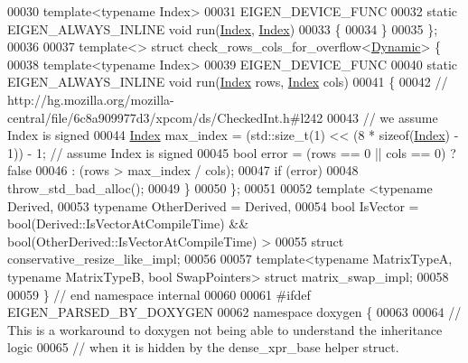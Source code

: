 \begin{DoxyCode}
00030   \textcolor{keyword}{template}<\textcolor{keyword}{typename} Index>
00031   EIGEN\_DEVICE\_FUNC
00032   \textcolor{keyword}{static} EIGEN\_ALWAYS\_INLINE \textcolor{keywordtype}{void} run(\hyperlink{namespace_eigen_a62e77e0933482dafde8fe197d9a2cfde}{Index}, \hyperlink{namespace_eigen_a62e77e0933482dafde8fe197d9a2cfde}{Index})
00033   \{
00034   \}
00035 \};
00036 
00037 \textcolor{keyword}{template}<> \textcolor{keyword}{struct }check\_rows\_cols\_for\_overflow<\hyperlink{namespace_eigen_ad81fa7195215a0ce30017dfac309f0b2}{Dynamic}> \{
00038   \textcolor{keyword}{template}<\textcolor{keyword}{typename} Index>
00039   EIGEN\_DEVICE\_FUNC
00040   \textcolor{keyword}{static} EIGEN\_ALWAYS\_INLINE \textcolor{keywordtype}{void} run(\hyperlink{namespace_eigen_a62e77e0933482dafde8fe197d9a2cfde}{Index} rows, \hyperlink{namespace_eigen_a62e77e0933482dafde8fe197d9a2cfde}{Index} cols)
00041   \{
00042     \textcolor{comment}{// http://hg.mozilla.org/mozilla-central/file/6c8a909977d3/xpcom/ds/CheckedInt.h#l242}
00043     \textcolor{comment}{// we assume Index is signed}
00044     \hyperlink{namespace_eigen_a62e77e0933482dafde8fe197d9a2cfde}{Index} max\_index = (std::size\_t(1) << (8 * \textcolor{keyword}{sizeof}(\hyperlink{namespace_eigen_a62e77e0933482dafde8fe197d9a2cfde}{Index}) - 1)) - 1; \textcolor{comment}{// assume Index is signed}
00045     \textcolor{keywordtype}{bool} error = (rows == 0 || cols == 0) ? \textcolor{keyword}{false}
00046                : (rows > max\_index / cols);
00047     \textcolor{keywordflow}{if} (error)
00048       throw\_std\_bad\_alloc();
00049   \}
00050 \};
00051 
00052 \textcolor{keyword}{template} <\textcolor{keyword}{typename} Derived,
00053           \textcolor{keyword}{typename} OtherDerived = Derived,
00054           \textcolor{keywordtype}{bool} IsVector = bool(Derived::IsVectorAtCompileTime) && bool(OtherDerived::IsVectorAtCompileTime)
      >
00055 \textcolor{keyword}{struct }conservative\_resize\_like\_impl;
00056 
00057 \textcolor{keyword}{template}<\textcolor{keyword}{typename} MatrixTypeA, \textcolor{keyword}{typename} MatrixTypeB, \textcolor{keywordtype}{bool} SwapPo\textcolor{keywordtype}{int}ers> \textcolor{keyword}{struct }matrix\_swap\_impl;
00058 
00059 \} \textcolor{comment}{// end namespace internal}
00060 
00061 \textcolor{preprocessor}{#ifdef EIGEN\_PARSED\_BY\_DOXYGEN}
00062 \textcolor{keyword}{namespace }doxygen \{
00063 
00064 \textcolor{comment}{// This is a workaround to doxygen not being able to understand the inheritance logic}
00065 \textcolor{comment}{// when it is hidden by the dense\_xpr\_base helper struct.}

\end{DoxyCode}
